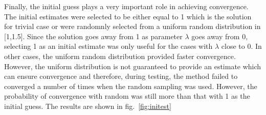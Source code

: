 \documentclass[11pt, oneside]{article}
\begin{document}
Finally, the initial guess plays a very important role in achieving convergence. The initial estimates were selected to be either equal to 1 which is the solution for trivial case or were randomnly selected from a uniform random distribution in [1,1.5]. Since the solution goes away from 1 as parameter $\lambda$ goes away from 0, selecting 1 as an initial estimate was only useful for the cases with $\lambda$ close to 0. In other cases, the uniform random distribution provided faster convergence. However, the uniform distribution is not guaranteed to provide an estimate which can ensure convergence and therefore, during testing, the method failed to converged a number of times when the random sampling was used. However, the probability of convergence with random was still more than that with 1 as the initial guess. The results are shown in fig.~\ref{fig:initest}
\end{document}
